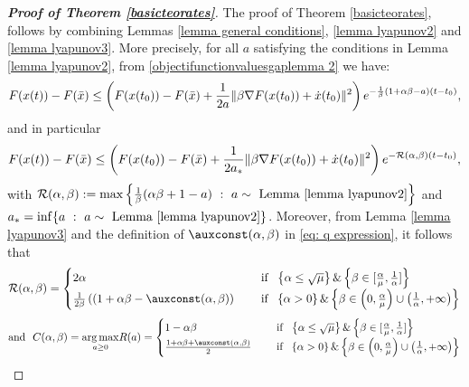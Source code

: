 \documentclass[reqno]{amsart}
\theoremstyle{plain}
\theoremstyle{definition}
\theoremstyle{remark}
\DeclareMathOperator*{\argmax}{arg\,max}	%
\DeclarePairedDelimiter{\norm}{\lVert}{\rVert}	%
\newcommand{\Rb}{\mathcal{R}}
\begin{document}
\begin{proof}[\textbf{Proof of Theorem \ref{basicteorates}}]
	The proof of Theorem \ref{basicteorates}, follows by combining Lemmas \ref{lemma general conditions}, \ref{lemma lyapunov2} and \ref{lemma lyapunov3}. More precisely, for all $a$ satisfying the conditions in Lemma \ref{lemma lyapunov2}, from \eqref{objectifunctionvaluesgaplemma 2} we have:
	\begin{equation}\label{bound on F in the proof of Thm}
		F(x(t))- F(\bar{x}) \leq \left(F(x(t_{0})) - F(\bar{x}) + \frac{1}{2a}\norm{\beta\nabla F(x(t_{0}))+\dot{x}(t_{0})}^2\right)e^{-\frac{1}{\beta}\left(1+\alpha\beta-a\right)(t-t_{0})},
	\end{equation}
	and in particular
		\begin{equation}\label{bound on F in the proof of Thm2}
		F(x(t))- F(\bar{x}) \leq \left(F(x(t_{0})) - F(\bar{x}) + \frac{1}{2a_{\ast}}\norm{\beta\nabla F(x(t_{0}))+\dot{x}(t_{0})}^2\right)e^{-\Rb(\alpha,\beta)(t-t_{0})},
	\end{equation}
with  $\Rb(\alpha,\beta) :=  \max\left\{\frac{1}{\beta}(\alpha\beta+1-a)~:~ a\sim \text{ Lemma \ref{lemma lyapunov2}}\right\}$ and $a_{\ast}=\inf\{a~:~a \sim \text{ Lemma \ref{lemma lyapunov2}}\}$. Moreover,  from Lemma \ref{lemma lyapunov3} and the definition of $\auxconst(\alpha,\beta)$ in \eqref{eq: q expression}, it follows that 
\begin{equation}
	\Rb(\alpha,\beta) =\begin{cases}
		2\alpha  \qquad \qquad \qquad \qquad  & \text{ if } ~   \left\{\alpha\leq \sqrt{\mu}\right\}\&  \left\{\beta\in[\frac{\alpha}{\mu},\frac{1}{\alpha}]\right\}   \\
		\frac{1}{2\beta}\left((1+\alpha\beta - \auxconst(\alpha,\beta) \right)   \quad  & \text{ if } ~   \left\{  \alpha > 0\right\} \& \left\{\beta\in \left(0, \frac{\alpha}{\mu}\right)\cup \left(\frac{1}{\alpha},+\infty\right) \right\} 
	\end{cases}
\end{equation}
\begin{equation}
\text{and } ~	C(\alpha,\beta) = \underset{a\geq 0}{\argmax} R(a) = \begin{cases}
			1-\alpha\beta   & \text{ if } ~   \left\{\alpha\leq \sqrt{\mu}\right\}\&  \left\{\beta\in[\frac{\alpha}{\mu},\frac{1}{\alpha}]\right\}  \\
			\frac{1+\alpha\beta + \auxconst(\alpha,\beta)}{2}   \quad   & \text{ if } ~   \left\{  \alpha > 0\right\} \& \left\{\beta\in \left(0, \frac{\alpha}{\mu}\right)\cup \left(\frac{1}{\alpha},+\infty\right) \right\} 
		\end{cases}
	\end{equation}




\end{proof}
\end{document}
